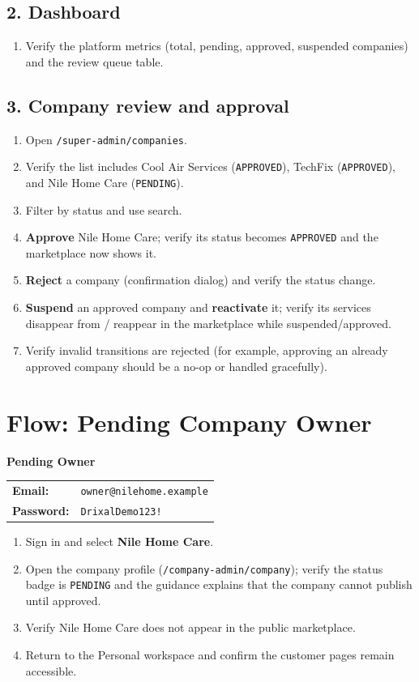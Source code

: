 \documentclass[11pt,a4paper]{article}
\makeatletter
\newcommand{\account}[3]{%
  \begin{tcolorbox}[colback=drixalsurface, colframe=drixalblue, boxrule=0.8pt, left=10pt, right=10pt, top=8pt, bottom=8pt, breakable]
    \textbf{\color{drixalblue}#1}\\
    \begin{tabular}{@{}ll}
      \textbf{Email:} & \texttt{#2} \\
      \textbf{Password:} & \texttt{#3} \\
    \end{tabular}
  \end{tcolorbox}
}
\makeatother
\begin{document}
\subsection{2. Dashboard}
\begin{enumerate}[leftmargin=2em, itemsep=2pt]
  \item Verify the platform metrics (total, pending, approved, suspended companies) and the review queue table.
\end{enumerate}

\subsection{3. Company review and approval}
\begin{enumerate}[leftmargin=2em, itemsep=2pt]
  \item Open \texttt{/super-admin/companies}.
  \item Verify the list includes Cool Air Services (\texttt{APPROVED}), TechFix (\texttt{APPROVED}), and Nile Home Care (\texttt{PENDING}).
  \item Filter by status and use search.
  \item \textbf{Approve} Nile Home Care; verify its status becomes \texttt{APPROVED} and the marketplace now shows it.
  \item \textbf{Reject} a company (confirmation dialog) and verify the status change.
  \item \textbf{Suspend} an approved company and \textbf{reactivate} it; verify its services disappear from / reappear in the marketplace while suspended/approved.
  \item Verify invalid transitions are rejected (for example, approving an already approved company should be a no-op or handled gracefully).
\end{enumerate}

\section{Flow: Pending Company Owner}
\label{sec:flow-owner}

\account{Pending Owner}{owner@nilehome.example}{DrixalDemo123!}

\begin{enumerate}[leftmargin=2em, itemsep=2pt]
  \item Sign in and select \textbf{Nile Home Care}.
  \item Open the company profile (\texttt{/company-admin/company}); verify the status badge is \texttt{PENDING} and the guidance explains that the company cannot publish until approved.
  \item Verify Nile Home Care does not appear in the public marketplace.
  \item Return to the Personal workspace and confirm the customer pages remain accessible.
\end{enumerate}
\end{document}
